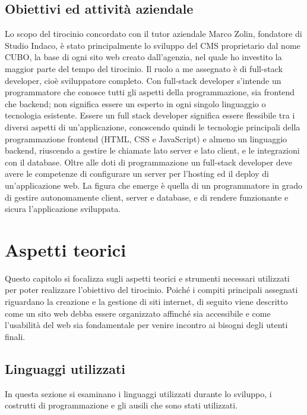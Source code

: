 \documentclass[12pt,a4paper]{article}
\begin{document}
\subsection{Obiettivi ed attività aziendale}
Lo scopo del tirocinio concordato con il tutor aziendale Marco Zolin, fondatore di Studio Indaco, è stato principalmente lo sviluppo del CMS proprietario dal nome CUBO, la base di ogni sito web creato dall’agenzia, nel  quale ho investito la maggior parte del tempo del tirocinio.
Il ruolo a me assegnato è di full-stack developer, cioè sviluppatore completo. Con full-stack developer s'intende un programmatore che conosce tutti gli aspetti della programmazione, sia frontend che backend; non significa essere un esperto in ogni singolo linguaggio o tecnologia esistente. Essere un full stack developer significa essere flessibile tra i diversi aspetti di un’applicazione, conoscendo quindi le tecnologie principali della programmazione frontend (HTML, CSS e JavaScript) e almeno un linguaggio backend, riuscendo a gestire le chiamate lato server e lato client, e le integrazioni con il database.
Oltre alle doti di programmazione un full-stack developer deve avere le competenze di configurare un server per l'hosting ed il deploy di un'applicazione web.
La figura che emerge è quella di un programmatore in grado di gestire autonomamente client, server e database, e di rendere funzionante e sicura l'applicazione sviluppata.
\clearpage
\section{Aspetti teorici}
Questo capitolo si focalizza sugli aspetti teorici e strumenti necessari utilizzati per poter realizzare l’obiettivo del tirocinio. Poiché i compiti principali assegnati riguardano la creazione e la gestione di siti internet, di seguito viene descritto come un sito web debba essere organizzato affinché sia accessibile e come l’usabilità del web sia fondamentale per venire incontro ai bisogni degli utenti finali.

\subsection{Linguaggi utilizzati}
In questa sezione si esaminano i linguaggi utilizzati durante lo sviluppo, i costrutti di programmazione e gli ausili che sono stati utilizzati.
\end{document}
